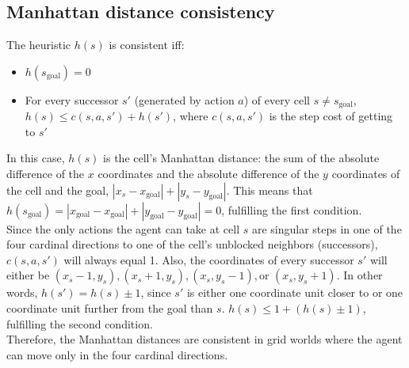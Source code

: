 \documentclass{article}
\begin{document}
\subsection{Manhattan distance consistency}
The heuristic $h(s)$ is consistent iff:\begin{itemize}
    \item $h(s_{\text{goal}})=0$
    \item For every successor $s'$ (generated by action $a$) of every cell $s \ne s_{\text{goal}}$, $h(s) \le c(s, a, s') + h(s')$, where $c(s, a, s')$ is the step cost of getting to $s'$
\end{itemize}
In this case, $h(s)$ is the cell's Manhattan distance: the sum of the absolute difference of the $x$ coordinates and the absolute difference of the $y$ coordinates of the cell and the goal, $|x_s-x_{\text{goal}}| + |y_s-y_{\text{goal}}|$. This means that $h(s_{\text{goal}})=|x_{\text{goal}}-x_{\text{goal}}| + |y_{\text{goal}}-y_{\text{goal}}| =0$, fulfilling the first condition.\\ 
Since the only actions the agent can take at cell $s$ are singular steps in one of the four cardinal directions to one of the cell's unblocked neighbors (successors), $c(s,a,s')$ will always equal 1. Also, the coordinates of every successor $s'$ will either be $(x_s-1, y_s), (x_s+1, y_s), (x_s, y_s-1), \text{or } (x_s, y_s+1)$. In other words, $h(s') = h(s) \pm 1$, since $s'$ is either one coordinate unit closer to or one coordinate unit further from the goal than $s$. $h(s) \le 1+(h(s) \pm 1)$, fulfilling the second condition.\\
Therefore, the Manhattan distances are consistent in
grid worlds where the agent can move only in the four cardinal directions.
\end{document}
